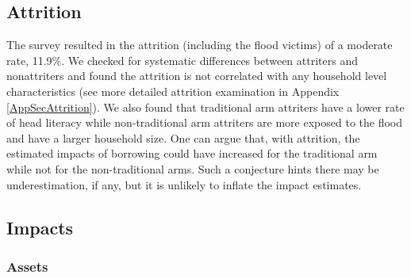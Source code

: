 \subsection{Attrition}
\label{SecAttrition}

	The survey resulted in the attrition (including the flood victims) of a moderate rate, 11.9\%. We checked for systematic differences between attriters and nonattriters 
	and found the attrition is not correlated with any household level characteristics (see more detailed attrition examination in Appendix \ref{AppSecAttrition}). %
	We also found that \textsf{traditional} arm attriters have a lower rate of head literacy while non-\textsf{traditional} arm attriters are more exposed to the flood and have a larger household size. One can argue that, with attrition, the estimated impacts of borrowing could have increased for the \textsf{traditional} arm while not for the non-\textsf{traditional} arms. Such a conjecture hints there may be underestimation, if any, but it is unlikely to inflate the impact estimates.

\subsection{Impacts}
\label{Sec Impacts}

\subsubsection{Assets}


